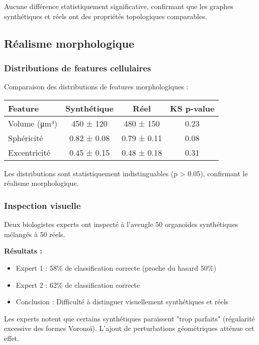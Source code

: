Aucune différence statistiquement significative, confirmant que les graphes synthétiques et réels ont des propriétés topologiques comparables.

\subsection{Réalisme morphologique}

\subsubsection{Distributions de features cellulaires}

Comparaison des distributions de features morphologiques :

\begin{center}
\begin{tabular}{|l|c|c|c|}
\hline
\textbf{Feature} & \textbf{Synthétique} & \textbf{Réel} & \textbf{KS p-value} \\
\hline
Volume (μm³) & 450 ± 120 & 480 ± 150 & 0.23 \\
Sphéricité & 0.82 ± 0.08 & 0.79 ± 0.11 & 0.08 \\
Excentricité & 0.45 ± 0.15 & 0.48 ± 0.18 & 0.31 \\
\hline
\end{tabular}
\end{center}

Les distributions sont statistiquement indistinguables (p > 0.05), confirmant le réalisme morphologique.

\subsubsection{Inspection visuelle}

Deux biologistes experts ont inspecté à l'aveugle 50 organoïdes synthétiques mélangés à 50 réels.

\textbf{Résultats :}
\begin{itemize}
    \item Expert 1 : 58\% de classification correcte (proche du hasard 50\%)
    \item Expert 2 : 62\% de classification correcte
    \item Conclusion : Difficulté à distinguer visuellement synthétiques et réels
\end{itemize}

Les experts notent que certains synthétiques paraissent "trop parfaits" (régularité excessive des formes Voronoï). L'ajout de perturbations géométriques atténue cet effet.

